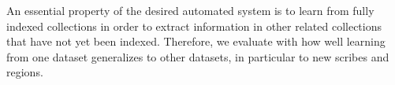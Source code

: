


An essential property of the desired automated system is to learn from fully indexed collections in order to extract information in other related collections that have not yet been indexed.
Therefore, we evaluate with how well learning from one dataset generalizes to other datasets, in particular to new scribes and regions.


